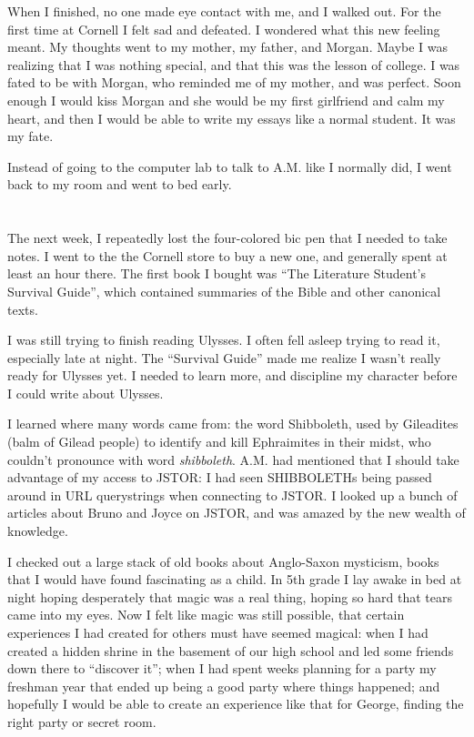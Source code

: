 When I finished, no one made eye contact with me, and I walked out.  For the
first time at Cornell I felt sad and defeated.  I wondered what this new feeling
meant.  My thoughts went to my mother, my father, and Morgan.  Maybe I was
realizing that I was nothing special, and that this was the lesson of college.
I was fated to be with Morgan, who reminded me of my mother, and was perfect.
Soon enough I would kiss Morgan and she would be my first girlfriend and calm my
heart, and then I would be able to write my essays like a normal student.  It
was my fate. 

Instead of going to the computer lab to talk to A.M. like I normally did, I went
back to my room and went to bed early.

\section{}

The next week, I repeatedly lost the four-colored bic pen that I needed to take
notes.  I went to the the Cornell store to buy a new one, and generally spent at
least an hour there.  The first book I bought was ``The Literature Student's
Survival Guide'', which contained summaries of the Bible and other canonical
texts.  

I was still trying to finish reading Ulysses.  I often fell asleep trying to
read it, especially late at night.  The ``Survival Guide'' made me realize I
wasn't really ready for Ulysses yet.  I needed to learn more, and discipline my
character before I could write about Ulysses.  

I learned where many words came from: the word Shibboleth, used by Gileadites
(balm of Gilead people) to identify and kill Ephraimites in their midst, who
couldn't pronounce with word \textit{shibboleth}.  A.M. had mentioned that I
should take advantage of my access to JSTOR: I had seen SHIBBOLETHs being passed
around in URL querystrings when connecting to JSTOR.  I looked up a bunch of
articles about Bruno and Joyce on JSTOR, and was amazed by the new wealth of
knowledge.

I checked out a large stack of old books about Anglo-Saxon mysticism, books that
I would have found fascinating as a child.  In 5th grade I lay awake in bed at
night hoping desperately that magic was a real thing, hoping so hard that tears
came into my eyes.  Now I felt like magic was still possible, that certain
experiences I had created for others must have seemed magical: when I had
created a hidden shrine in the basement of our high school and led some friends
down there to ``discover it''; when I had spent weeks planning for a party my
freshman year that ended up being a good party where things happened; and
hopefully I would be able to create an experience like that for George, finding
the right party or secret room.  

